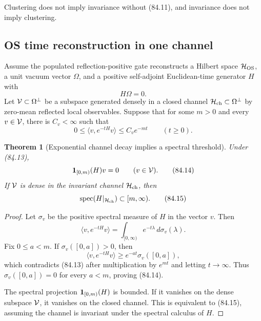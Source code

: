 \documentclass[11pt]{article}
\newtheorem{theorem}{Theorem}[section]
\theoremstyle{remark}
\begin{document}
Clustering does not imply invariance without (84.11), and invariance
does not imply clustering.

\subsection{OS time reconstruction in one channel}

Assume the populated reflection-positive gate reconstructs a Hilbert
space \({\cal H}_{\rm OS}\), a unit vacuum vector \(\Omega\), and a
positive self-adjoint Euclidean-time generator \(H\) with
\[
                              H\Omega=0.
\]
Let \({\cal V}\subset\Omega^\perp\) be a subspace generated densely
in a closed channel \({\cal H}_{\rm ch}\subset\Omega^\perp\) by
zero-mean reflected local observables.  Suppose that for some \(m>0\)
and every \(v\in{\cal V}\), there is \(C_v<\infty\) such that
\begin{equation}
                         0\leq
 \langle v,e^{-tH}v\rangle
 \leq C_ve^{-mt}
 \qquad(t\geq0).                                            \tag{84.13}
\end{equation}

\begin{theorem}[Exponential channel decay implies a spectral
threshold]
\label{thm:v12v84-spectral}
Under (84.13),
\begin{equation}
 {\bf1}_{[0,m)}(H)v=0\qquad(v\in{\cal V}).                   \tag{84.14}
\end{equation}
If \({\cal V}\) is dense in the invariant channel
\({\cal H}_{\rm ch}\), then
\begin{equation}
 \operatorname{spec}(H|_{{\cal H}_{\rm ch}})
 \subset[m,\infty).                                         \tag{84.15}
\end{equation}
\end{theorem}

\begin{proof}
Let \(\sigma_v\) be the positive spectral measure of \(H\) in the
vector \(v\).  Then
\[
 \langle v,e^{-tH}v\rangle
 =\int_{[0,\infty)}e^{-t\lambda}\,d\sigma_v(\lambda).        \tag{84.16}
\]
Fix \(0\leq a<m\).  If
\(\sigma_v([0,a])>0\), then
\[
 \langle v,e^{-tH}v\rangle
 \geq e^{-at}\sigma_v([0,a]),
\]
which contradicts (84.13) after multiplication by \(e^{mt}\) and
letting \(t\to\infty\).  Thus
\(\sigma_v([0,a])=0\) for every \(a<m\), proving (84.14).

The spectral projection \({\bf1}_{[0,m)}(H)\) is bounded.  If it
vanishes on the dense subspace \({\cal V}\), it vanishes on the
closed channel.  This is equivalent to (84.15), assuming the channel
is invariant under the spectral calculus of \(H\).
\end{proof}
\end{document}
